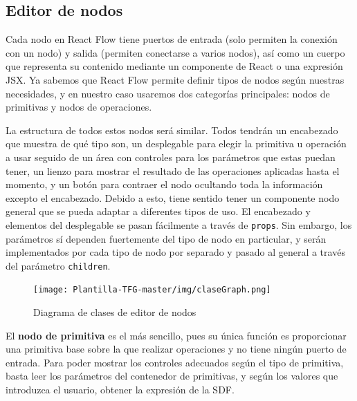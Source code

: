 \subsection{Editor de nodos}\label{sec:editorNodos}
Cada nodo en React Flow tiene puertos de entrada (solo permiten la conexión con un nodo) y salida (permiten conectarse a varios nodos), así como un cuerpo que representa su contenido mediante un componente de React o una expresión JSX. Ya sabemos que React Flow permite definir tipos de nodos según nuestras necesidades, y en nuestro caso usaremos dos categorías principales: nodos de primitivas y nodos de operaciones.\newline

La estructura de todos estos nodos será similar. Todos tendrán un encabezado que muestra de qué tipo son, un desplegable para elegir la primitiva u operación a usar seguido de un área con controles para los parámetros que estas puedan tener, un lienzo para mostrar el resultado de las operaciones aplicadas hasta el momento, y un botón para contraer el nodo ocultando toda la información excepto el encabezado. Debido a esto, tiene sentido tener un componente nodo general que se pueda adaptar a diferentes tipos de uso. El encabezado y elementos del desplegable se pasan fácilmente a través de \texttt{props}. Sin embargo, los parámetros sí dependen fuertemente del tipo de nodo en particular, y serán implementados por cada tipo de nodo por separado y pasado al general a través del parámetro \texttt{children}.\newline
\begin{figure}[ht!]
    \centering
    \texttt{[image: Plantilla-TFG-master/img/claseGraph.png]}
    \caption{Diagrama de clases de editor de nodos}
    \label{fig:claseGraph}
\end{figure}

El \textbf{nodo de primitiva} es el más sencillo, pues su única función es proporcionar una primitiva base sobre la que realizar operaciones y no tiene ningún puerto de entrada. Para poder mostrar los controles adecuados según el tipo de primitiva, basta leer los parámetros del contenedor de primitivas, y según los valores que introduzca el usuario, obtener la expresión de la SDF.\newline

